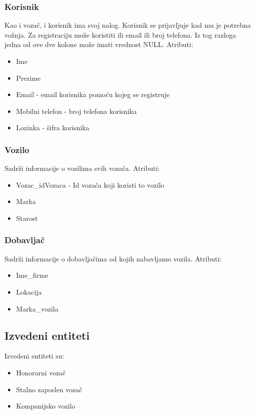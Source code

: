 \subsubsection{\textbf{Korisnik}}

Kao i vozač, i korisnik ima svoj nalog. Korisnik se prijavljuje kad mu je potrebna vožnja. Za registraciju može koristiti ili email ili broj telefona. Iz tog razloga jedna od ove dve kolone može imati vrednost NULL. Atributi:
\begin{itemize}
    \item Ime
    \item Prezime
    \item Email - email korisnika pomoću kojeg se registruje
    \item Mobilni telefon - broj telefona korisnika
    \item Lozinka - šifra korisnika
\end{itemize}

\subsubsection{\textbf{Vozilo}}

Sadrži informacije o vozilima svih vozača. Atributi:
\begin{itemize}
    \item Vozac\_idVozaca - Id vozača koji koristi to vozilo
    \item Marka
    \item Starost
\end{itemize}

\subsubsection{\textbf{Dobavljač}}
Sadrži informacije o dobavljačima od kojih nabavljamo vozila. Atributi:
\begin{itemize}
    \item Ime\_firme
    \item Lokacija
    \item Marka\_vozila
\end{itemize}


\subsection{\textbf{Izvedeni entiteti}}
Izvedeni entiteti su:
\begin{itemize}
    \item Honorarni vozač
    \item Stalno zaposlen vozač
    \item Kompanijsko vozilo
\end{itemize}

